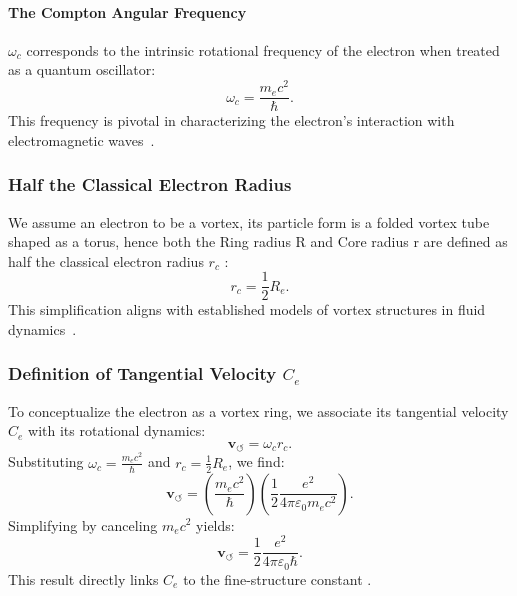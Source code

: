 \documentclass[a4paper,10pt]{article}
\begin{document}
\paragraph*{The Compton Angular Frequency}
 $\omega_c$ corresponds to the intrinsic rotational frequency of the electron when treated as a quantum oscillator:
\begin{equation*}
    \omega_c = \frac{m_e c^2}{\hbar}.
\end{equation*}
This frequency is pivotal in characterizing the electron's interaction with electromagnetic waves~\cite{kelvin1867}.

\subsubsection*{Half the Classical Electron Radius}
We assume an electron to be a vortex, its particle form is a folded vortex tube shaped as a torus, hence both the Ring radius R and Core radius r are defined as half the classical electron radius  $r_c$ :
\begin{equation*}
    r_c = \frac{1}{2} R_e.
\end{equation*}
This simplification aligns with established models of vortex structures in fluid dynamics~\cite{kleckner2013}.

\subsubsection*{Definition of Tangential Velocity $C_e$}
To conceptualize the electron as a vortex ring, we associate its tangential velocity $C_e$ with its rotational dynamics:
\begin{equation*}
    \mathbf{v}_{\scriptscriptstyle\boldsymbol{\circlearrowleft}} = \omega_c r_c.
\end{equation*}
Substituting $\omega_c = \frac{m_e c^2}{\hbar}$ and $r_c = \frac{1}{2} R_e$, we find:
\begin{equation*}
    \mathbf{v}_{\scriptscriptstyle\boldsymbol{\circlearrowleft}} = \left( \frac{m_e c^2}{\hbar} \right) \left( \frac{1}{2} \frac{e^2}{4\pi \varepsilon_0 m_e c^2} \right).
\end{equation*}
Simplifying by canceling $m_e c^2$ yields:
\begin{equation*}
    \mathbf{v}_{\scriptscriptstyle\boldsymbol{\circlearrowleft}} = \frac{1}{2} \frac{e^2}{4\pi \varepsilon_0 \hbar}.\label{eq:C_e-from-compton}
\end{equation*}
This result directly links $C_e$ to the fine-structure constant \cite{vinen2024}.
\end{document}
